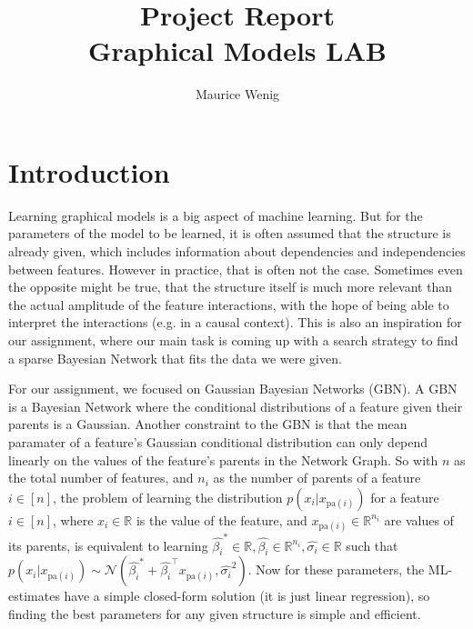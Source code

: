 \documentclass[sigconf, fleqn, prologue, dvipsnames]{acmart}
\def\R{\mathbb{R}}
\def\T{\top}
\def\pa{\text{pa}}
\begin{document}
\title[Project Report]{Project Report\\\large Graphical Models LAB}
\author{Maurice Wenig}

\maketitle


\section{Introduction}
Learning graphical models is a big aspect of machine learning.
But for the parameters of the model to be learned, it is often assumed that the structure is already given, which includes information about dependencies and independencies between features.
However in practice, that is often not the case.
Sometimes even the opposite might be true, that the structure itself is much more relevant than the actual amplitude of the feature interactions, with the hope of being able to interpret the interactions (e.g. in a causal context).
This is also an inspiration for our assignment, where our main task is coming up with a search strategy to find a sparse Bayesian Network that fits the data we were given.

For our assignment, we focused on Gaussian Bayesian Networks (GBN).
A GBN is a Bayesian Network where the conditional distributions of a feature given their parents is a Gaussian.
Another constraint to the GBN is that the mean paramater of a feature's Gaussian conditional distribution can only depend linearly on the values of the feature's parents in the Network Graph.
So with $n$ as the total number of features, and $n_i$ as the number of parents of a feature $i \in [n]$, the problem of learning the distribution $p(x_i | x_{\pa(i)})$ for a feature $i \in [n]$, where $x_i \in \R$ is the value of the feature, and $x_{\pa(i)} \in \R^{n_i}$ are values of its parents, is equivalent to learning $\hat{\beta_i}^* \in \R, \hat{\beta_i} \in \R^{n_i}, \hat{\sigma_i} \in \R$ such that $p(x_i | x_{\pa(i)}) \sim \mathcal{N}(\hat{\beta_i}^* + \hat{\beta_i}^\T x_{\pa(i)}, \hat{\sigma_i}^2)$.
Now for these parameters, the ML-estimates have a simple closed-form solution (it is just linear regression), so finding the best parameters for any given structure is simple and efficient.
\end{document}
